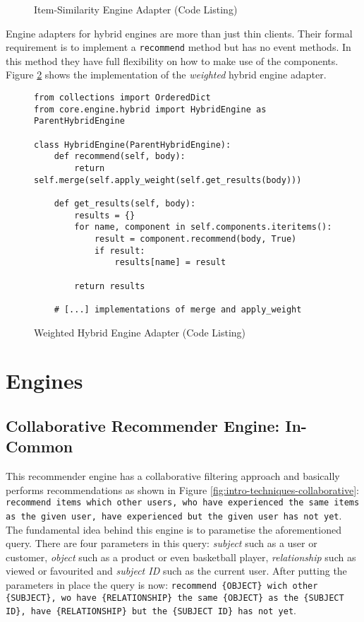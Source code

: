 \begin{figure}[!ht]
    \inputminted{py}{./includes/source/framework/engines/item\string_similarity.py}
    \caption{Item-Similarity Engine Adapter (Code Listing)}
    \label{fig:implementation-framework-engine-adapter}
\end{figure}

Engine adapters for hybrid engines are more than just thin clients. Their formal requirement is to implement a \texttt{recommend} method but has no event methods. In this method they have full flexibility on how to make use of the components. Figure \ref{fig:implementation-framework-hybrid-engine-adapter} shows the implementation of the \emph{weighted} hybrid engine adapter.

\begin{figure}[!ht]
    \begin{verbatim}
from collections import OrderedDict
from core.engine.hybrid import HybridEngine as ParentHybridEngine

class HybridEngine(ParentHybridEngine):
    def recommend(self, body):
        return self.merge(self.apply_weight(self.get_results(body)))

    def get_results(self, body):
        results = {}
        for name, component in self.components.iteritems():
            result = component.recommend(body, True)
            if result:
                results[name] = result

        return results

    # [...] implementations of merge and apply_weight
    \end{verbatim}
    \caption{Weighted Hybrid Engine Adapter (Code Listing)}
    \label{fig:implementation-framework-hybrid-engine-adapter}
\end{figure}



\section{Engines}

\subsection{Collaborative Recommender Engine: In-Common}

This recommender engine has a collaborative filtering approach and basically performs recommendations as shown in Figure \ref{fig:intro-techniques-collaborative}: \texttt{recommend items which other users, who have experienced the same items as the given user, have experienced but the given user has not yet}. The fundamental idea behind this engine is to parametise the aforementioned query. There are four parameters in this query: \emph{subject} such as a user or customer, \emph{object} such as a product or even basketball player, \emph{relationship} such as viewed or favourited and \emph{subject ID} such as the current user. After putting the parameters in place the query is now: \texttt{recommend \{OBJECT\} wich other \{SUBJECT\}, wo have \{RELATIONSHIP\} the same \{OBJECT\} as the \{SUBJECT ID\}, have \{RELATIONSHIP\} but the \{SUBJECT ID\} has not yet}.

